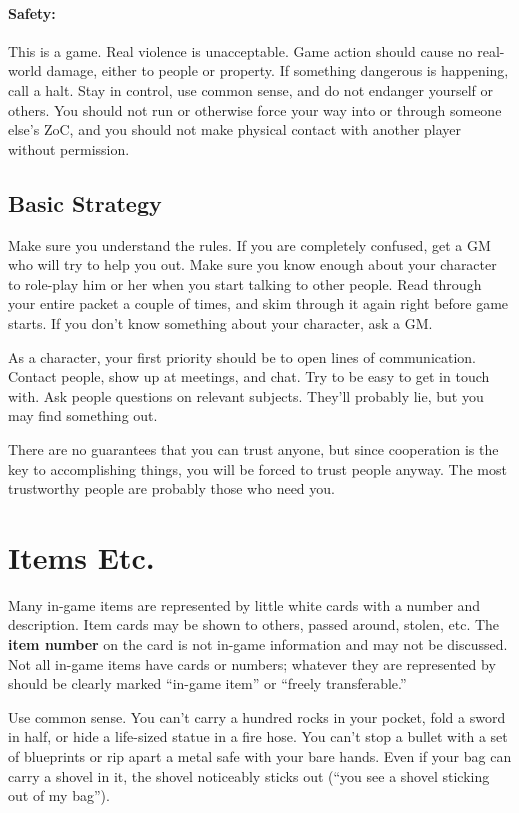 \documentclass[sheet]{airship}
\begin{document}
\paragraph{Safety:} This is a game.  Real violence is unacceptable.
Game action should cause no real-world damage, either to people or
property.  If something dangerous is happening, call a halt.  Stay in
control, use common sense, and do not endanger yourself or others.
You should not run or otherwise force your way into or through someone
else's ZoC, and you should not make physical contact with another
player without permission.

\subsection{Basic Strategy}

Make sure you understand the rules.  If you are completely confused,
get a GM who will try to help you out.  Make sure you know enough
about your character to role-play him or her when you start talking to
other people.  Read through your entire packet a couple of times, and
skim through it again right before game starts.  If you don't know
something about your character, ask a GM.

As a character, your first priority should be to open lines of
communication.  Contact people, show up at meetings, and chat.  Try to
be easy to get in touch with.  Ask people questions on relevant
subjects.  They'll probably lie, but you may find something out.

There are no guarantees that you can trust anyone, but since
cooperation is the key to accomplishing things, you will be forced to
trust people anyway.  The most trustworthy people are probably those
who need you.

\section{Items Etc.}

Many in-game items are represented by little white cards with a number
and description.  Item cards may be shown to others, passed around,
stolen, etc.  The {\bf item number} on the card is not in-game
information and may not be discussed.  Not all in-game items have
cards or numbers; whatever they are represented by should be clearly
marked ``in-game item'' or ``freely transferable.''

Use common sense.  You can't carry a hundred rocks in your pocket,
fold a sword in half, or hide a life-sized statue in a fire hose.  You
can't stop a bullet with a set of blueprints or rip apart a metal safe
with your bare hands.  Even if your bag can carry a shovel in it, the
shovel noticeably sticks out (``you see a shovel sticking out of my
bag'').
\end{document}
